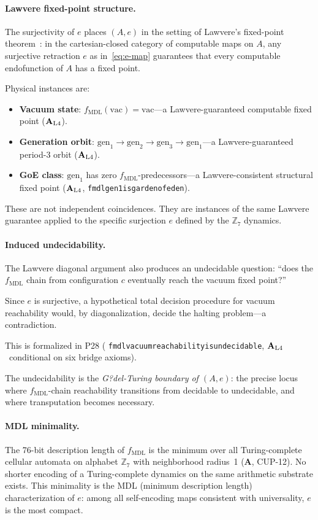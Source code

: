 \documentclass[12pt,letterpaper]{article}
\newcommand{\fmdl}{f_{\mathrm{MDL}}}
\newcommand{\Zseven}{\mathbb{Z}_7}
\newcommand{\catAL}{\ensuremath{\textbf{A}_{\rm L4}}}
\newcommand{\catA}{\textbf{A}}
\newcommand{\lean}[1]{%
  \penalty-100
  \begingroup\def\_{\textunderscore\allowbreak}\texttt{#1}\endgroup}
\begin{document}
\paragraph{Lawvere fixed-point structure.}
The surjectivity of $e$ places $(A, e)$ in the setting of Lawvere's fixed-point
theorem~\cite{Lawvere1969}: in the cartesian-closed category of computable maps on $A$,
any surjective retraction $e$ as in~\eqref{eq:e-map} guarantees that every computable
endofunction of $A$ has a fixed point.

Physical instances are:
\begin{itemize}[nosep]
  \item \textbf{Vacuum state}: $\fmdl(\mathrm{vac}) = \mathrm{vac}$---a
        Lawvere-guaranteed computable fixed point (\catAL).
  \item \textbf{Generation orbit}: $\mathrm{gen}_1 \to \mathrm{gen}_2 \to
        \mathrm{gen}_3 \to \mathrm{gen}_1$---a Lawvere-guaranteed period-3 orbit
        (\catAL).
  \item \textbf{GoE class}: $\mathrm{gen}_1$ has zero $\fmdl$-predecessors---a
        Lawvere-consistent structural fixed point (\catAL,
        \lean{fmdl\_gen1\_is\allowbreak\_garden\_of\_eden}).
\end{itemize}
These are not independent coincidences.  They are instances of the same Lawvere
guarantee applied to the specific surjection $e$ defined by the $\Zseven$ dynamics.

\paragraph{Induced undecidability.}
The Lawvere diagonal argument also produces an undecidable question: ``does the
$\fmdl$ chain from configuration $c$ eventually reach the vacuum fixed point?''

Since $e$ is surjective, a hypothetical total decision procedure for vacuum
reachability would, by diagonalization, decide the halting problem---a contradiction.

This is formalized in P28 (\lean{fmdl\_vacuum\_reachability\_is\_undecidable},
\catAL\ conditional on six bridge axioms).

The undecidability is the \emph{G?del-Turing boundary of $(A, e)$}: the precise
locus where $\fmdl$-chain reachability transitions from decidable to undecidable, and
where transputation becomes necessary.

\paragraph{MDL minimality.}
The 76-bit description length of $\fmdl$ is the minimum over all Turing-complete
cellular automata on alphabet $\Zseven$ with neighborhood radius~1 (\catA, CUP-12).
No shorter encoding of a Turing-complete dynamics on the same arithmetic substrate
exists.  This minimality is the MDL (minimum description length) characterization
of $e$: among all self-encoding maps consistent with universality, $e$ is the most
compact.
\end{document}

